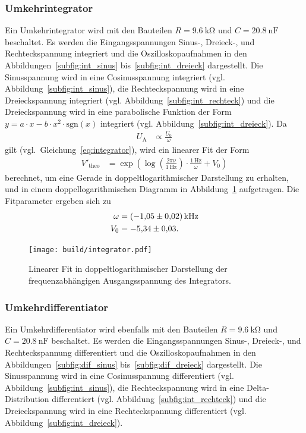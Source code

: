 \subsubsection{Umkehrintegrator}
Ein Umkehrintegrator wird mit den Bauteilen $R = \SI{9.6}{\kilo\ohm}$ und $C = \SI{20.8}{\nano\farad}$ beschaltet.
Es werden die Eingangsspannungen Sinus-, Dreieck-, und Rechteckspannung integriert und die Oszilloskopaufnahmen in den Abbildungen~\ref{subfig:int_sinus} bis~\ref{subfig:int_dreieck} dargestellt.
Die Sinusspannung wird in eine Cosinusspannung integriert (vgl. Abbildung~\ref{subfig:int_sinus}),
die Rechteckspannung wird in eine Dreieckspannung integriert (vgl. Abbildung~\ref{subfig:int_rechteck})
und die Dreieckspannung wird in eine parabolische Funktion der Form $y = a \cdot x - b \cdot x^2 \cdot \text{sgn}(x)$ integriert (vgl. Abbildung~\ref{subfig:int_dreieck}).
Da
\begin{align*}
  U_\text{A} &\propto \frac{U_0}{\omega}
\end{align*}
gilt (vgl.\ Gleichung~\eqref{eq:integrator}),
wird ein linearer Fit der Form
\begin{align*}
  V'_\text{theo} &= \exp\!{\left(\log\!{\left(\frac{2 \pi \nu}{\SI{1}{\hertz}}\right)} \cdot
  \frac{\SI{1}{\hertz}}{\omega} + V_0 \right)}
\end{align*}
berechnet, um eine Gerade in doppeltlogarithmischer Darstellung zu erhalten,
und in einem doppellogarithmischen Diagramm in Abbildung~\ref{fig:int} aufgetragen.
Die Fitparameter ergeben sich zu
\begin{align*}
  \omega &= \SI{-1.05 \pm 0.02}{\kilo\hertz} \\
  V_0 &= \num{-5.34 \pm 0.03}.
\end{align*}

\begin{figure}[ht]
  \centering
  \texttt{[image: build/integrator.pdf]}
  \caption{Linearer Fit in doppeltlogarithmischer Darstellung der frequenzabhängigen Ausgangsspannung des Integrators.}
  \label{fig:int}
\end{figure}

\subsubsection{Umkehrdifferentiator}
Ein Umkehrdifferentiator wird ebenfalls mit den Bauteilen $R = \SI{9.6}{\kilo\ohm}$ und $C = \SI{20.8}{\nano\farad}$ beschaltet.
Es werden die Eingangsspannungen Sinus-, Dreieck-, und Rechteckspannung differentiert und die Oszilloskopaufnahmen in den Abbildungen~\ref{subfig:dif_sinus} bis~\ref{subfig:dif_dreieck} dargestellt.
Die Sinusspannung wird in eine Cosinusspannung differentiert (vgl. Abbildung~\ref{subfig:int_sinus}),
die Rechteckspannung wird in eine Delta-Distribution differentiert (vgl. Abbildung~\ref{subfig:int_rechteck})
und die Dreieckspannung wird in eine Rechteckspannung  differentiert (vgl. Abbildung~\ref{subfig:int_dreieck}).

